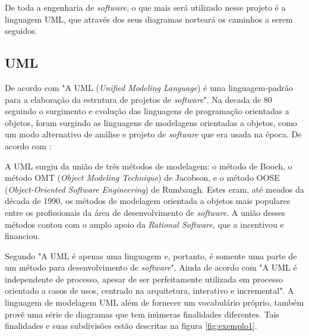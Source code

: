 	\par De toda a engenharia de \textit{software}, o que mais será utilizado nesse
projeto é a linguagem UML, que através dos seus diagramas norteará os caminhos
a serem seguidos.
	
	\subsection{UML}
		
		\par De acordo com  "A UML (\textit{Unified Modeling
	Language}) é uma linguagem-padrão para a elaboração da estrutura de projetos
	de \textit{software}". Na decada de 80 seguindo o surgimento e evolução das
	linguagens de programação orientadas a objetos, foram surgindo as linguagens de
	modelagens orientadas a objetos, como um modo alternativo de análise e projeto
	de \textit{software} que era usada na época. De acordo com
	:
		\begin{citacao}
			A UML surgiu da união de três métodos de modelagem: o método de Booch, o
			método OMT (\textit{Object Modeling Technique}) de Jacobson, e o método OOSE
			(\textit{Object-Oriented Software Engineering}) de Rumbaugh. Estes eram, até
			meados da década de 1990, os métodos de modelagem orientada a objetos mais
			populares entre os profissionais da área de desenvolvimento de
			\textit{software}. A união desses métodos contou com o amplo apoio da
			\textit{Rational Software}, que a incentivou e financiou.
		\end{citacao}
		
			\par Segundo  "A UML é apenas uma linguagem e, 
		 portanto, é somente uma parte de um método para desenvolvimento de
		 \textit{software}". Ainda de acordo com  "A
		 UML é independente de processo, apesar de ser perfeitamente utilizada em
		 processo orientado a casos de usos, centrado na arquitetura, interativo e
		 incremental". A linguagem de modelagem UML além de fornecer um vocabulário
		 próprio, também provê uma série de diagramas que tem inúmeras finalidades
		 diferentes. Tais finalidades e suas subdivisões estão descritas na figura
		 \ref{fig:exemplo1}.
				
